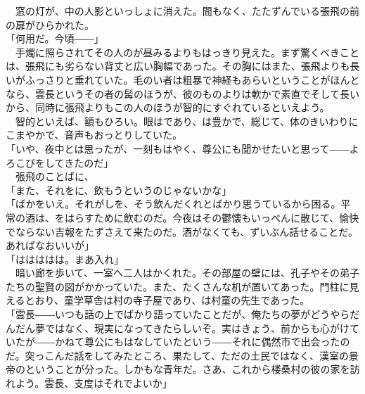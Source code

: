 \documentclass[
  paper=a5,
  fontsize=10pt,
  jafontsize=9.5pt,
  tate,                  %
  open_bracket_pos=nibu, %
]{jlreq}
\begin{document}
　窓の灯が、中の人影といっしょに消えた。間もなく、たたずんでいる張飛の前の扉がひらかれた。\\


「何用だ。今頃――」\\


　手燭に照らされてその人のが昼みるよりもはっきり見えた。まず驚くべきことは、張飛にも劣らない背丈と広い胸幅であった。その胸にはまた、張飛よりも長いがふっさりと垂れていた。毛のい者は粗暴で神経もあらいということがほんとなら、雲長というその者の髯のほうが、彼のものよりは軟かで素直でそして長いから、同時に張飛よりもこの人のほうが智的にすぐれているといえよう。\\


　智的といえば、額もひろい。眼はであり、は豊かで、総じて、体のきいわりにこまやかで、音声もおっとりしていた。\\


「いや、夜中とは思ったが、一刻もはやく、尊公にも聞かせたいと思って――よろこびをしてきたのだ」\\


　張飛のことばに、\\


「また、それをに、飲もうというのじゃないかな」\\


「ばかをいえ。それがしを、そう飲んだくれとばかり思うているから困る。平常の酒は、をはらすために飲むのだ。今夜はその鬱懐もいっぺんに散じて、愉快でならない吉報をたずさえて来たのだ。酒がなくても、ずいぶん話せることだ。あればなおいいが」\\


「ははははは。まあ入れ」\\


　暗い廊を歩いて、一室へ二人はかくれた。その部屋の壁には、孔子やその弟子たちの聖賢の図がかかっていた。また、たくさんな机が置いてあった。門柱に見えるとおり、童学草舎は村の寺子屋であり、は村童の先生であった。\\


「雲長――いつも話の上でばかり語っていたことだが、俺たちの夢がどうやらだんだん夢ではなく、現実になってきたらしいぞ。実はきょう、前からも心がけていたが――かねて尊公にもはなしていたという――それに偶然市で出会ったのだ。突っこんだ話をしてみたところ、果たして、ただの土民ではなく、漢室の景帝のということが分った。しかもな青年だ。さあ、これから楼桑村の彼の家を訪れよう。雲長、支度はそれでよいか」\\
\end{document}

